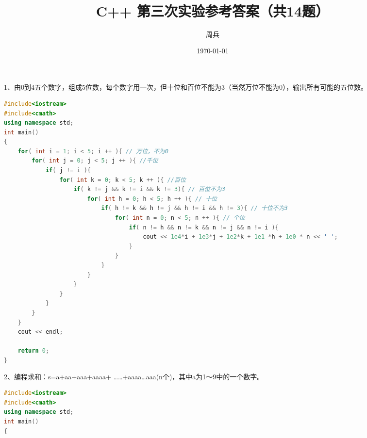 \documentclass[14pt,aps,prb]{revtex4}
\begin{document}
\begin{spacing}{1.5}

\title{C++ 第三次实验参考答案（共14题）}
\author{周兵}

\date{\today}%
\maketitle



1、由0到4五个数字，组成5位数，每个数字用一次，但十位和百位不能为3（当然万位不能为0），输出所有可能的五位数。
\begin{lstlisting}[language=C++]
#include<iostream>
#include<cmath>
using namespace std;
int main()
{
    for( int i = 1; i < 5; i ++ ){ // 万位，不为0
        for( int j = 0; j < 5; j ++ ){ //千位
            if( j != i ){
                for( int k = 0; k < 5; k ++ ){ //百位
                    if( k != j && k != i && k != 3){ // 百位不为3
                        for( int h = 0; h < 5; h ++ ){ // 十位
                            if( h != k && h != j && h != i && h != 3){ // 十位不为3
                                for( int n = 0; n < 5; n ++ ){ // 个位
                                    if( n != h && n != k && n != j && n != i ){ 
                                        cout << 1e4*i + 1e3*j + 1e2*k + 1e1 *h + 1e0 * n << ' ';
                                    }
                                }
                            }
                        }
                    }
                }
            }
        }
    }
    cout << endl;

    return 0;
}
\end{lstlisting}

2、编程求和：s=a+aa+aaa+aaaa+ ……+aaaa…aaa(n个)，其中a为1～9中的一个数字。
\begin{lstlisting}[language=C++]
#include<iostream>
#include<cmath>
using namespace std;
int main()
{


\end{lstlisting}
\end{spacing}
\end{document}
